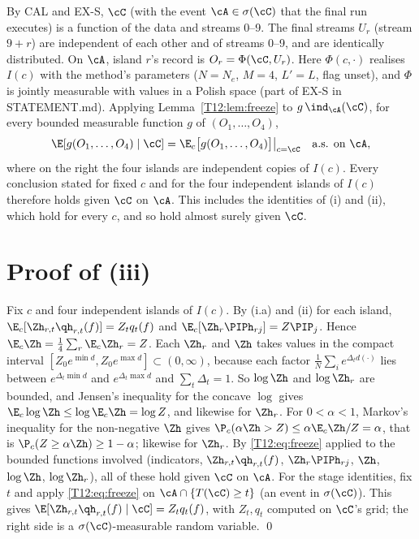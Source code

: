 \documentclass[11pt]{report}
\begin{document}
By CAL and EX-S, $\cC$ (with the event $\cA\in\sigma(\cC)$ that the final run executes) is a function of the data and streams 0--9. The final streams $U_r$ (stream $9+r$) are independent of each other and of streams 0--9, and are identically distributed. On $\cA$, island $r$'s record is $O_r=\Phi(\cC,U_r)$. Here $\Phi(c,\cdot)$ realises $I(c)$ with the method's parameters ($N=N_e$, $M=4$, $L'=L$, flag unset), and $\Phi$ is jointly measurable with values in a Polish space (part of EX-S in STATEMENT.md). Applying Lemma~\ref{T12:lem:freeze} to $g\,\ind_\cA(\cC)$, for every bounded measurable function $g$ of $(O_1,\dots,O_4)$,
\begin{equation}\label{T12:eq:freeze}
\E[g(O_1,\dots,O_4)\mid\cC]=\E_c\big[g(O_1,\dots,O_4)\big]\big|_{c=\cC}\quad\text{a.s. on }\cA,
\end{equation}
where on the right the four islands are independent copies of $I(c)$. Every conclusion stated for fixed $c$ and for the four independent islands of $I(c)$ therefore holds given $\cC$ on $\cA$. This includes the identities of (i) and (ii), which hold for every $c$, and so hold almost surely given $\cC$.

\section{Proof of (iii)}

Fix $c$ and four independent islands of $I(c)$. By (i.a) and (ii) for each island, $\E_c[\Zh_{r,t}\qh_{r,t}(f)]=Z_tq_t(f)$ and $\E_c[\Zh_r\PIPh_{rj}]=Z\PIP_j$. Hence $\E_c\Zh=\frac14\sum_r\E_c\Zh_r=Z$. Each $\Zh_r$ and $\Zh$ takes values in the compact interval $[Z_0e^{\min d},Z_0e^{\max d}]\subset(0,\infty)$, because each factor $\frac1N\sum_ie^{\Delta_td(\cdot)}$ lies between $e^{\Delta_t\min d}$ and $e^{\Delta_t\max d}$ and $\sum_t\Delta_t=1$. So $\log\Zh$ and $\log\Zh_r$ are bounded, and Jensen's inequality for the concave $\log$ gives $\E_c\log\Zh\le\log\E_c\Zh=\log Z$, and likewise for $\Zh_r$. For $0<\alpha<1$, Markov's inequality for the non-negative $\Zh$ gives $\P_c(\alpha\Zh>Z)\le\alpha\E_c\Zh/Z=\alpha$, that is $\P_c(Z\ge\alpha\Zh)\ge1-\alpha$; likewise for $\Zh_r$. By \eqref{T12:eq:freeze} applied to the bounded functions involved (indicators, $\Zh_{r,t}\qh_{r,t}(f)$, $\Zh_r\PIPh_{rj}$, $\Zh$, $\log\Zh$, $\log\Zh_r$), all of these hold given $\cC$ on $\cA$. For the stage identities, fix $t$ and apply \eqref{T12:eq:freeze} on $\cA\cap\{T(\cC)\ge t\}$ (an event in $\sigma(\cC)$). This gives $\E[\Zh_{r,t}\qh_{r,t}(f)\mid\cC]=Z_tq_t(f)$, with $Z_t,q_t$ computed on $\cC$'s grid; the right side is a $\sigma(\cC)$-measurable random variable. \qed
\end{document}
